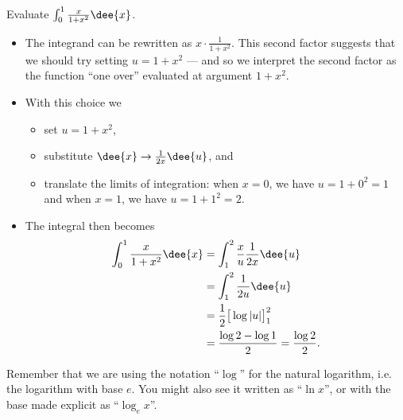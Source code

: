 \begin{eg}\label{eg:substitution6}
Evaluate $\int_0^1\frac{x}{1+x^2}\dee{x}$.

\soln
\begin{itemize}
 \item The integrand can be rewritten as $x \cdot \frac{1}{1+x^2}$. This second factor
suggests that we should try setting $u=1+x^2$ --- and so we interpret the
second factor as the function ``one over'' evaluated at argument $1+x^2$.
\item With this choice we
\begin{itemize}
\item set $u=1+x^2$,
\item substitute $\dee{x} \rightarrow \frac{1}{2x}\dee{u}$, and
\item translate the limits of integration: when $x=0$, we have $u=1+0^2=1$ and when
$x=1$, we have $u=1+1^2=2$.
\end{itemize}
\item The integral then becomes
\begin{align*}
\int_0^1\frac{x}{1+x^2}\dee{x}
&= \int_1^2 \frac{x}{u} \frac{1}{2x}\dee{u} \\
&= \int_1^2 \frac{1}{2u} \dee{u} \\
&= \frac{1}{2} \big[ \log|u| \big]_1^2 \\
&= \frac{\log 2 - \log 1}{2} = \frac{\log 2}{2}.
\end{align*}
\end{itemize}
Remember that we are using the notation ``$\log$'' for the natural
logarithm, i.e. the logarithm with base $e$. You might also see it written as ``$\ln
x$'', or with the base made explicit as ``$\log_e x$''.
\end{eg}

